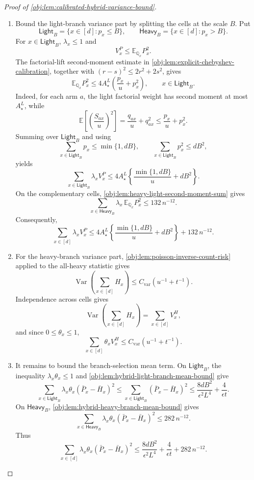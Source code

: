 \begin{proof}[Proof of \cref{obj:lem:calibrated-hybrid-variance-bound}]
\begin{enumerate}
\item Bound the light-branch variance part by splitting the cells at the scale \(B\). Put
\[
\mathsf{Light}_B=\{x\in[d]:p_x\le B\},\qquad
\mathsf{Heavy}_B=\{x\in[d]:p_x>B\}.
\]
For \(x\in\mathsf{Light}_B\), \(\lambda_x\le1\) and
\[
V^P_x\le \mathbb E_{\mathbb Q_x}P_x^2.
\]
The factorial-lift second-moment estimate in \cref{obj:lem:explicit-chebyshev-calibration}, together with
\((r-s)^2\le2r^2+2s^2\), gives
\[
\mathbb E_{\mathbb Q_x}P_x^2
\le
4A_\star^L\left(\frac{p_x}{u}+p_x^2\right),
\qquad x\in\mathsf{Light}_B .
\]
Indeed, for each arm \(a\), the light factorial weight has second moment at most \(A_\star^L\), while
\[
\mathbb E\left[\left(\frac{S_{ax}}u\right)^2\right]
=
\frac{q_{ax}}u+q_{ax}^2
\le
\frac{p_x}{u}+p_x^2 .
\]
Summing over \(\mathsf{Light}_B\) and using
\[
\sum_{x\in\mathsf{Light}_B}p_x\le \min\{1,dB\},
\qquad
\sum_{x\in\mathsf{Light}_B}p_x^2\le dB^2,
\]
yields
\[
\sum_{x\in\mathsf{Light}_B}\lambda_x V^P_x
\le
4A_\star^L
\left\{
\frac{\min\{1,dB\}}{u}+dB^2
\right\}.
\]
On the complementary cells, \cref{obj:lem:heavy-light-second-moment-sum} gives
\[
\sum_{x\in\mathsf{Heavy}_B}\lambda_x\,\mathbb E_{\mathbb Q_x}P_x^2
\le 132\,n^{-12}.
\]
Consequently,
\[
\sum_{x\in[d]}\lambda_x V^P_x
\le
4A_\star^L
\left\{
\frac{\min\{1,dB\}}{u}+dB^2
\right\}
+132\,n^{-12}.
\]

\item For the heavy-branch variance part, \cref{obj:lem:poisson-inverse-count-risk} applied to the all-heavy statistic gives
\[
\operatorname{Var}\!\left(\sum_{x\in[d]}H_x\right)
\le
C_{\mathrm{var}}\left(u^{-1}+t^{-1}\right).
\]
Independence across cells gives
\[
\operatorname{Var}\!\left(\sum_{x\in[d]}H_x\right)
=
\sum_{x\in[d]}V^H_x,
\]
and since \(0\le\theta_x\le1\),
\[
\sum_{x\in[d]}\theta_x V^H_x
\le
C_{\mathrm{var}}\left(u^{-1}+t^{-1}\right).
\]

\item It remains to bound the branch-selection mean term. On \(\mathsf{Light}_B\), the inequality \(\lambda_x\theta_x\le1\) and \cref{obj:lem:hybrid-light-branch-mean-bound} give
\[
\sum_{x\in\mathsf{Light}_B}
\lambda_x\theta_x(\bar P_x-\bar H_x)^2
\le
\sum_{x\in\mathsf{Light}_B}(\bar P_x-\bar H_x)^2
\le
\frac{8dB^2}{\epsilon^2L^4}
+
\frac{4}{\epsilon t}.
\]
On \(\mathsf{Heavy}_B\), \cref{obj:lem:hybrid-heavy-branch-mean-bound} gives
\[
\sum_{x\in\mathsf{Heavy}_B}
\lambda_x\theta_x(\bar P_x-\bar H_x)^2
\le
282\,n^{-12}.
\]
Thus
\[
\sum_{x\in[d]}
\lambda_x\theta_x(\bar P_x-\bar H_x)^2
\le
\frac{8dB^2}{\epsilon^2L^4}
+
\frac{4}{\epsilon t}
+
282\,n^{-12}.
\]


\end{enumerate}
\end{proof}
